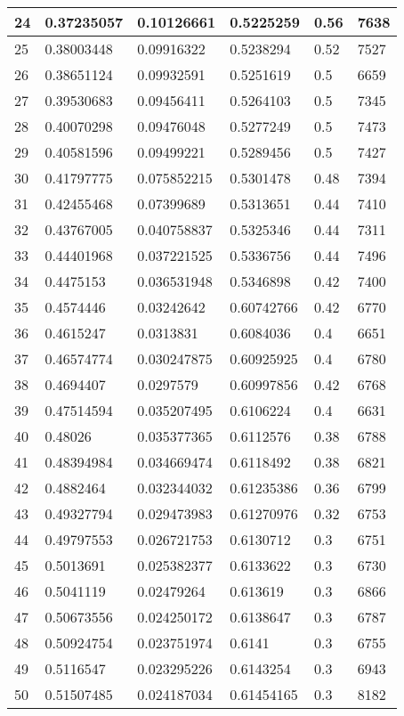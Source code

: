 \begin{longtable}{|l|l|l|l|l|l|}
24 & 0.37235057 & 0.10126661 & 0.5225259 & 0.56 & 7638 \\ \hline 
25 & 0.38003448 & 0.09916322 & 0.5238294 & 0.52 & 7527 \\ \hline 
26 & 0.38651124 & 0.09932591 & 0.5251619 & 0.5 & 6659 \\ \hline 
27 & 0.39530683 & 0.09456411 & 0.5264103 & 0.5 & 7345 \\ \hline 
28 & 0.40070298 & 0.09476048 & 0.5277249 & 0.5 & 7473 \\ \hline 
29 & 0.40581596 & 0.09499221 & 0.5289456 & 0.5 & 7427 \\ \hline 
30 & 0.41797775 & 0.075852215 & 0.5301478 & 0.48 & 7394 \\ \hline 
31 & 0.42455468 & 0.07399689 & 0.5313651 & 0.44 & 7410 \\ \hline 
32 & 0.43767005 & 0.040758837 & 0.5325346 & 0.44 & 7311 \\ \hline 
33 & 0.44401968 & 0.037221525 & 0.5336756 & 0.44 & 7496 \\ \hline 
34 & 0.4475153 & 0.036531948 & 0.5346898 & 0.42 & 7400 \\ \hline 
35 & 0.4574446 & 0.03242642 & 0.60742766 & 0.42 & 6770 \\ \hline 
36 & 0.4615247 & 0.0313831 & 0.6084036 & 0.4 & 6651 \\ \hline 
37 & 0.46574774 & 0.030247875 & 0.60925925 & 0.4 & 6780 \\ \hline 
38 & 0.4694407 & 0.0297579 & 0.60997856 & 0.42 & 6768 \\ \hline 
39 & 0.47514594 & 0.035207495 & 0.6106224 & 0.4 & 6631 \\ \hline 
40 & 0.48026 & 0.035377365 & 0.6112576 & 0.38 & 6788 \\ \hline 
41 & 0.48394984 & 0.034669474 & 0.6118492 & 0.38 & 6821 \\ \hline 
42 & 0.4882464 & 0.032344032 & 0.61235386 & 0.36 & 6799 \\ \hline 
43 & 0.49327794 & 0.029473983 & 0.61270976 & 0.32 & 6753 \\ \hline 
44 & 0.49797553 & 0.026721753 & 0.6130712 & 0.3 & 6751 \\ \hline 
45 & 0.5013691 & 0.025382377 & 0.6133622 & 0.3 & 6730 \\ \hline 
46 & 0.5041119 & 0.02479264 & 0.613619 & 0.3 & 6866 \\ \hline 
47 & 0.50673556 & 0.024250172 & 0.6138647 & 0.3 & 6787 \\ \hline 
48 & 0.50924754 & 0.023751974 & 0.6141 & 0.3 & 6755 \\ \hline 
49 & 0.5116547 & 0.023295226 & 0.6143254 & 0.3 & 6943 \\ \hline 
50 & 0.51507485 & 0.024187034 & 0.61454165 & 0.3 & 8182 \\ \hline 
\end{longtable}